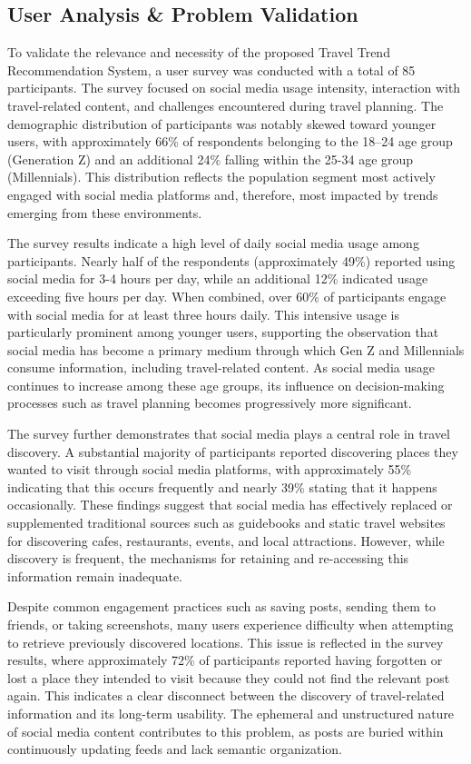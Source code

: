 \documentclass[a4paper,12pt]{report}
\begin{document}
\subsection{User Analysis \& Problem Validation}
To validate the relevance and necessity of the proposed Travel Trend Recommendation System, a user survey \cite{survey} was conducted with a total of 85 participants. The survey focused on social media usage intensity, interaction with travel-related content, and challenges encountered during travel planning. The demographic distribution of participants was notably skewed toward younger users, with approximately 66\% of respondents belonging to the 18–24 age group (Generation Z) and an additional 24\% falling within the 25-34 age group (Millennials). This distribution reflects the population segment most actively engaged with social media platforms and, therefore, most impacted by trends emerging from these environments.

The survey results indicate a high level of daily social media usage among participants. Nearly half of the respondents (approximately 49\%) reported using social media for 3-4 hours per day, while an additional 12\% indicated usage exceeding five hours per day. When combined, over 60\% of participants engage with social media for at least three hours daily. This intensive usage is particularly prominent among younger users, supporting the observation that social media has become a primary medium through which Gen Z and Millennials consume information, including travel-related content. As social media usage continues to increase among these age groups, its influence on decision-making processes such as travel planning becomes progressively more significant.

The survey further demonstrates that social media plays a central role in travel discovery. A substantial majority of participants reported discovering places they wanted to visit through social media platforms, with approximately 55\% indicating that this occurs frequently and nearly 39\% stating that it happens occasionally. These findings suggest that social media has effectively replaced or supplemented traditional sources such as guidebooks and static travel websites for discovering cafes, restaurants, events, and local attractions. However, while discovery is frequent, the mechanisms for retaining and re-accessing this information remain inadequate.

Despite common engagement practices such as saving posts, sending them to friends, or taking screenshots, many users experience difficulty when attempting to retrieve previously discovered locations. This issue is reflected in the survey results, where approximately 72\% of participants reported having forgotten or lost a place they intended to visit because they could not find the relevant post again. This indicates a clear disconnect between the discovery of travel-related information and its long-term usability. The ephemeral and unstructured nature of social media content contributes to this problem, as posts are buried within continuously updating feeds and lack semantic organization.
\end{document}
